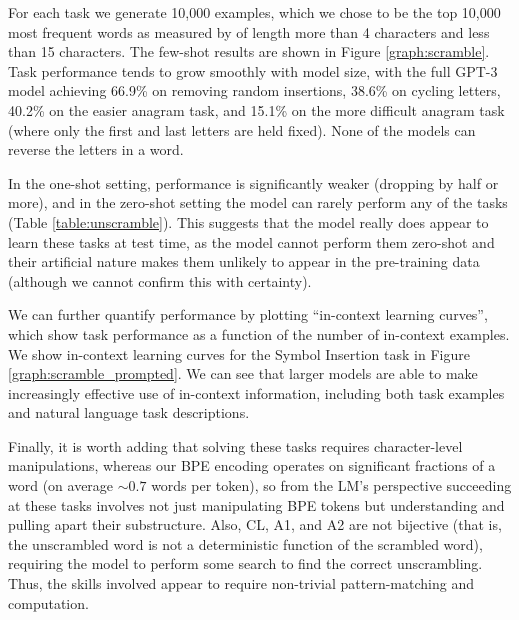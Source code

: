 \documentclass{article}
\begin{document}
For each task we generate 10,000 examples, which we chose to be the top 10,000 most frequent words as measured by \cite{norvig2009ngram} of length more than 4 characters and less than 15 characters. The few-shot results are shown in Figure \ref{graph:scramble}.  Task performance tends to grow smoothly with model size, with the full GPT-3 model achieving 66.9\% on removing random insertions, 38.6\% on cycling letters, 40.2\% on the easier anagram task, and 15.1\% on the more difficult anagram task (where only the first and last letters are held fixed).  None of the models can reverse the letters in a word. 

In the one-shot setting, performance is significantly weaker (dropping by half or more), and in the zero-shot setting the model can rarely perform any of the tasks (Table \ref{table:unscramble}).  This suggests that the model really does appear to learn these tasks at test time, as the model cannot perform them zero-shot and their artificial nature makes them unlikely to appear in the pre-training data (although we cannot confirm this with certainty).

We can further quantify performance by plotting ``in-context learning curves'', which show task performance as a function of the number of in-context examples.  We show in-context learning curves for the Symbol Insertion task in Figure \ref{graph:scramble_prompted}.  We can see that larger models are able to make increasingly effective use of in-context information, including both task examples and natural language task descriptions.

Finally, it is worth adding that solving these tasks requires character-level manipulations, whereas our BPE encoding operates on significant fractions of a word (on average $\sim0.7$ words per token), so from the LM’s perspective succeeding at these tasks involves not just manipulating BPE tokens but understanding and pulling apart their substructure. Also, CL, A1, and A2 are not bijective (that is, the unscrambled word is not a deterministic function of the scrambled word), requiring the model to perform some search to find the correct unscrambling. Thus, the skills involved appear to require non-trivial pattern-matching and computation.
\end{document}
